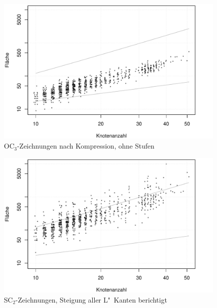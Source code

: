 \documentclass{beamer}
\begin{document}
\begin{frame}
\begin{figure}[h]
  \centering
  \includegraphics[width=.9\textwidth]{plots/area_orthogonal_compressed}
  \caption{OC$_3$-Zeichnungen nach Kompression, ohne Stufen}
  \label{fig:ortho-compress}
\end{figure}
\end{frame}

\begin{frame}
\begin{figure}[h]
  \centering
  \includegraphics[width=.9\textwidth]{plots/area_smooth}
  \caption{SC$_2$-Zeichnungen, Steigung aller L"~Kanten berichtigt}
  \label{fig:smooth-noOpti}
\end{figure}
\end{frame}
\end{document}
